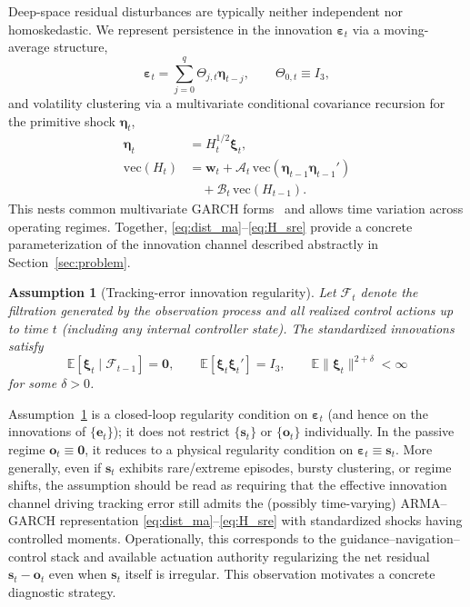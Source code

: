 \documentclass{article}
\newtheorem{assumption}{Assumption}
\begin{document}
Deep-space residual disturbances are typically neither independent nor homoskedastic. We represent persistence in the innovation
$\boldsymbol{\varepsilon}_t$ via a moving-average structure,
\begin{equation}
\boldsymbol{\varepsilon}_t = \sum_{j=0}^{q} \Theta_{j,t}\boldsymbol{\eta}_{t-j},\qquad \Theta_{0,t}\equiv I_3,
\label{eq:dist_ma}
\end{equation}
and volatility clustering via a multivariate conditional covariance recursion for the primitive shock $\boldsymbol{\eta}_t$,
\begin{equation}
\begin{aligned}
\boldsymbol{\eta}_t &= H_t^{1/2}\boldsymbol{\xi}_t,\\
\mathrm{vec}(H_t)
&=\mathbf{w}_t
+\mathcal{A}_t\,\mathrm{vec}\!\left(\boldsymbol{\eta}_{t-1}\boldsymbol{\eta}_{t-1}'\right) \\
&\quad +\mathcal{B}_t\,\mathrm{vec}(H_{t-1}).
\end{aligned}
\label{eq:H_sre}
\end{equation}
This nests common multivariate GARCH forms~\cite{bougerol1992strict,straumann2006quasi} and allows time variation across operating regimes.
Together, \eqref{eq:dist_ma}--\eqref{eq:H_sre} provide a concrete parameterization of the innovation channel described abstractly in Section~\ref{sec:problem}.

\begin{assumption}[Tracking-error innovation regularity]
\label{ass:armagarch_reg}
Let $\mathcal{F}_t$ denote the filtration generated by the observation process and all realized control actions up to time $t$
(including any internal controller state). The standardized innovations satisfy
\[
\mathbb{E}[\boldsymbol{\xi}_t\mid \mathcal{F}_{t-1}]=\mathbf{0},\qquad
\mathbb{E}[\boldsymbol{\xi}_t\boldsymbol{\xi}_t']=I_3,\qquad
\mathbb{E}\|\boldsymbol{\xi}_t\|^{2+\delta}<\infty
\]
for some $\delta>0$.
\end{assumption}

Assumption~\ref{ass:armagarch_reg} is a closed-loop regularity condition on $\boldsymbol{\varepsilon}_t$ (and hence on the innovations
of $\{\mathbf{e}_t\}$); it does not restrict $\{\mathbf{s}_t\}$ or $\{\mathbf{o}_t\}$ individually. In the passive regime
$\mathbf{o}_t\equiv\mathbf{0}$, it reduces to a physical regularity condition on $\boldsymbol{\varepsilon}_t\equiv\mathbf{s}_t$.
More generally, even if $\mathbf{s}_t$ exhibits rare/extreme episodes, bursty clustering, or regime shifts, the assumption should be read
as requiring that the effective innovation channel driving tracking error still admits the (possibly time-varying) ARMA--GARCH representation
\eqref{eq:dist_ma}--\eqref{eq:H_sre} with standardized shocks having controlled moments. Operationally, this corresponds to the guidance--navigation--control
stack and available actuation authority regularizing the net residual $\mathbf{s}_t-\mathbf{o}_t$ even when $\mathbf{s}_t$ itself is irregular.
This observation motivates a concrete diagnostic strategy.
\end{document}
